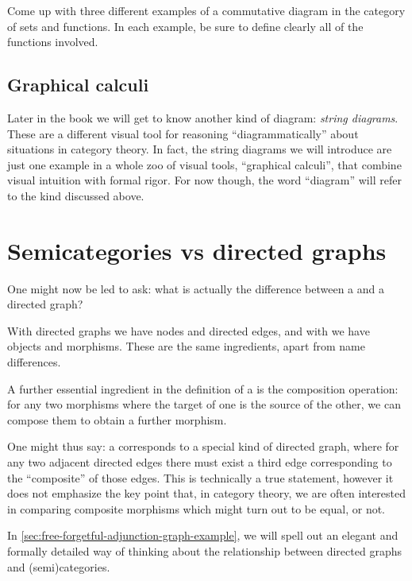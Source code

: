 
\begin{gradedexercise}
    \label{ex:InventingCommDiagrams}
    
Come up with three different examples of a commutative diagram in the category of sets and functions. In each example, be sure to define clearly all of the functions involved.
  
\end{gradedexercise}
  

\subsection{Graphical calculi}

Later in the book we will get to know another kind of diagram: \emph{string diagrams}.
These are a different visual tool for reasoning ``diagrammatically'' about situations in category theory.
In fact, the string diagrams we will introduce are just one example in a whole zoo of visual tools, ``graphical calculi'', that combine visual intuition with formal rigor.
For now though, the word ``diagram'' will refer to the kind discussed above.


\section[Categories vs graphs]{Semicategories vs directed graphs}

One might now be led to ask: what is actually the difference between a  and a directed graph?

With directed graphs we have nodes and directed edges, and with  we have objects and morphisms.
These are the same ingredients, apart from name differences.

A further essential ingredient in the definition of a  is the composition operation: for any two morphisms where the target of one is the source of the other, we can compose them to obtain a further morphism.

One might thus say: a  corresponds to a special kind of directed graph, where for any two adjacent directed edges there must exist a third edge corresponding to the ``composite'' of those edges.
This is technically a true statement, however it does not emphasize the key point that, in category theory, we are often interested in comparing composite morphisms which might turn out to be equal, or not.

In \cref{sec:free-forgetful-adjunction-graph-example}, we will spell out an elegant and formally detailed way of thinking about the relationship between directed graphs and (semi)categories.
